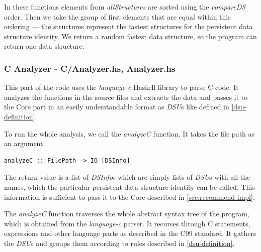 \documentclass[a4paper,11pt]{article}
\begin{document}
\begin{appendices}
		In these functions elements from \emph{allStructures} are sorted using the \emph{compareDS} order.
		Then we take the group of first elements that are equal within this ordering --- the structures
		represent the fastest structures for the persistent data structure identity. We return a random
		fastest data structure, so the program can return one data structure.
		
		\subsubsection{C Analyzer - C/Analyzer.hs, Analyzer.hs}
		This part of the code uses the \emph{language-c} Haskell library to parse C code. 
		It analyzes the functions in the source files and extracts the data and passes it
		to the Core part in an easily understandable format as \emph{DSU}s like defined in \autoref{dsu-definition}.

		To run the whole analysis, we call the \emph{analyzeC} function. It takes the file path as an argument.
\begin{verbatim}
analyzeC :: FilePath -> IO [DSInfo]
\end{verbatim}
		The return value is a list of \emph{DSInfo}s which are simply lists of \emph{DSU}s with all the names, 
		which the particular persistent data structure identity can be called. This information is 
		sufficient to pass it to the Core described in \autoref{sec:recommend-impl}.

		The \emph{analyzeC} function traverses the whole abstract syntax tree of the program, which
		is obtained from the \emph{language-c} parser. It recurses through C statements, expressions 
		and other language parts as described in the C99 standard. It gathers the \emph{DSU}s and groups them
		according to rules described in \autoref{dsu-definition}.
				

\end{appendices}
\end{document}
